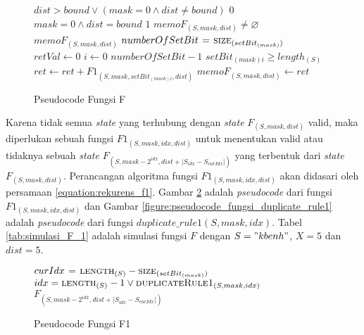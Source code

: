\begin{figure}[H]
	\begin{mdframed}
		\begin{codebox}
			\li \If $ dist > bound \lor (mask = 0  \land  dist \neq bound)$ \Then
			\li 	\Return $ 0 $
				\End
			\li \If $ mask = 0  \land  dist = bound$ \Then
			\li 	\Return $ 1 $
				\End
			\li \If $ memoF_{(S, mask, dist)} \neq \varnothing$ \Then
			\li 	\Return $ memoF_{(S, mask, dist)} $
				\End
			\li	$ numberOfSetBit \mathrel{\hspace{1pt}=\hspace{1pt}} \textnormal{\scshape size}_{(setBit_{(mask)})} $
			\li	$ retVal \gets 0 $
			\li	\For $ i \gets 0 $ \To $numberOfSetBit - 1$ \Do
			\li		\If $setBit_{(mask)i} \geq length_{(S)}$ \Then
			\li			{}
					\End
			\li		$ret \gets ret + F1_{(S, mask, setBit_{(mask)i}, dist)}$
				\End
			\li	\Return $ memoF_{(S, mask, dist)} \gets ret $						
		\end{codebox}
	\end{mdframed}
	\caption{Pseudocode Fungsi F}
	\label{figure:pseudocode_fungsi_f}
\end{figure}

Karena tidak semua \textit{state} yang terhubung dengan \textit{state} $F_{(S, mask, dist)}$ valid, maka diperlukan sebuah fungsi $F1_{(S, mask, idx, dist)}$ untuk menentukan valid atau tidaknya sebuah \textit{state} $F_{(S, mask - 2^{idx}, dist +|S_{idx} - S_{curIdx}|)}$ yang terbentuk dari \textit{state} $F_{(S, mask, dist)}$. Perancangan algoritma fungsi $F1_{(S, mask, idx, dist)}$ akan didasari oleh persamaan \ref{equation:rekurens_f1}. Gambar \ref{figure:pseudocode_fungsi_f1} adalah \textit{pseudocode} dari fungsi $F1_{(S, mask, idx, dist)}$ dan Gambar \ref{figure:pseudocode_fungsi_duplicate_rule1} adalah \textit{pseudocode} dari fungsi $ duplicate\_rule1(S,mask,idx) $. Tabel \ref{tab:simulasi_F_1} adalah simulasi fungsi $ F $ dengan $ S="kbenh" $, $ X=5 $ dan $ dist= 5$.

\begin{figure}[H]
	\begin{mdframed}
		\begin{codebox}
			\Procname{$\proc{F1}(S, mask, idx, dist)$}
			\li $curIdx \mathrel{\hspace{1pt}=\hspace{1pt}} \textnormal{\scshape length}_{(S)} - \textnormal{\scshape size}_{(setBit_{(mask)})}$			
			\li \If $ idx = \textnormal{\scshape length}_{(S)} - 1 \lor \textnormal{\scshape duplicateRule1}_{(S, mask, idx)}$ \Then
			\li 	\Return $ F_{(S, mask - 2^{idx}, dist + | S_{idx} - S_{curIdx} |)} $
			\End						
		\end{codebox}
	\end{mdframed}
	\caption{Pseudocode Fungsi F1}
	\label{figure:pseudocode_fungsi_f1}
\end{figure}

